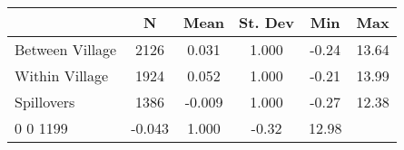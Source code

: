 \begin{tabular}{l*{5}{c}}\hline&\multicolumn{1}{c}{N}&\multicolumn{1}{c}{Mean}&\multicolumn{1}{c}{St. Dev}&\multicolumn{1}{c}{Min}&\multicolumn{1}{c}{Max}\\ \hline 
Between Village & 2126 & 0.031 & 1.000 & -0.24 & 13.64 \\
Within Village & 1924 & 0.052 & 1.000 & -0.21 & 13.99 \\
Spillovers & 1386 & -0.009 & 1.000 & -0.27 & 12.38 \\
0 0 1199 & -0.043 & 1.000 & -0.32 & 12.98 \\
\hline \end{tabular}
